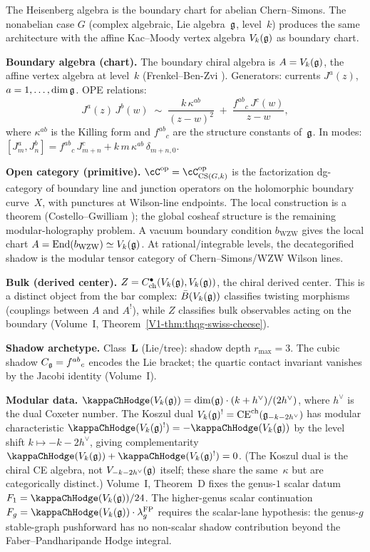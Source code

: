 The Heisenberg algebra is the boundary chart for abelian
Chern--Simons. The nonabelian case $G$ (complex algebraic,
Lie algebra~$\mathfrak{g}$, level~$k$) produces the same architecture
with the affine Kac--Moody vertex algebra $V_k(\mathfrak{g})$ as boundary
chart.

\noindent\textbf{Boundary algebra (chart).}
The boundary chiral algebra is $A = V_k(\mathfrak{g})$, the affine
vertex algebra at level~$k$
(Frenkel--Ben-Zvi \cite{FBZ04}).
Generators: currents $J^a(z)$, $a = 1, \ldots, \dim \mathfrak{g}$.
OPE relations:
\begin{equation}\label{eq:cs-km-ope}
J^a(z)\, J^b(w)
\;\sim\;
\frac{k\,\kappa^{ab}}{(z-w)^2}
\;+\;
\frac{f^{ab}{}_c\, J^c(w)}{z-w},
\end{equation}
where $\kappa^{ab}$ is the Killing form and $f^{ab}{}_c$
are the structure constants of~$\mathfrak{g}$. In modes:
$[J^a_m, J^b_n] = f^{ab}{}_c\, J^c_{m+n}
+ k\, m\, \kappa^{ab}\, \delta_{m+n,0}$.

\noindent\textbf{Open category (primitive).}
$\cC^{\mathrm{op}} = \cC_{\mathrm{CS}(G,k)}^{\mathrm{op}}$
is the factorization dg-category of boundary
line and junction operators on the holomorphic boundary
curve~$X$, with punctures at Wilson-line endpoints.
The local construction is a theorem
(Costello--Gwilliam \cite{CG17}); the global cosheaf
structure is the remaining modular-holography problem.
A vacuum boundary condition $b_{\mathrm{WZW}}$ gives the
local chart
$A = \mathrm{End}(b_{\mathrm{WZW}}) \simeq V_k(\mathfrak{g})$.
At rational/integrable levels, the decategorified shadow
is the modular tensor category of
Chern--Simons/WZW Wilson lines.

\noindent\textbf{Bulk (derived center).}
$Z = C^\bullet_{\mathrm{ch}}(V_k(\mathfrak{g}), V_k(\mathfrak{g}))$,
the chiral derived center.
This is a distinct object from the bar complex:
$\bar{B}(V_k(\mathfrak{g}))$ classifies twisting morphisms
(couplings between $A$ and $A^!$),
while $Z$ classifies bulk observables acting on
the boundary
(Volume~I, Theorem~\ref*{V1-thm:thqg-swiss-cheese}).

\noindent\textbf{Shadow archetype.}
Class~$\mathbf{L}$ (Lie/tree): shadow depth
$r_{\max} = 3$. The cubic shadow
$C_{\mathfrak{g}} = f^{ab}{}_c$ encodes the Lie bracket;
the quartic contact invariant vanishes
by the Jacobi identity
(Volume~I).

\noindent\textbf{Modular data.}
$\kappaChHodge(V_k(\fg)) = \dim(\fg) \cdot (k + h^\vee)/(2h^\vee)$,
where $h^\vee$ is the dual Coxeter number.
The Koszul dual
$V_k(\mathfrak{g})^! = \mathrm{CE}^{\mathrm{ch}}(\mathfrak{g}_{-k-2h^\vee})$
has modular characteristic
$\kappaChHodge(V_k(\fg)^!) = -\kappaChHodge(V_k(\fg))$
by the level shift $k \mapsto -k - 2h^\vee$,
giving complementarity
$\kappaChHodge(V_k(\fg)) + \kappaChHodge(V_k(\fg)^!) = 0$.
(The Koszul dual is the chiral CE algebra, not
$V_{-k-2h^\vee}(\mathfrak{g})$ itself; these share the
same~$\kappa$ but are categorically distinct.)
Volume~I, Theorem~D fixes the genus-$1$ scalar datum
$F_1 = \kappaChHodge(V_k(\fg))/24$.
The higher-genus scalar continuation
$F_g = \kappaChHodge(V_k(\fg)) \cdot \lambda_g^{\mathrm{FP}}$
requires the scalar-lane hypothesis: the genus-$g$ stable-graph
pushforward has no non-scalar shadow contribution beyond the
Faber--Pandharipande Hodge integral.

